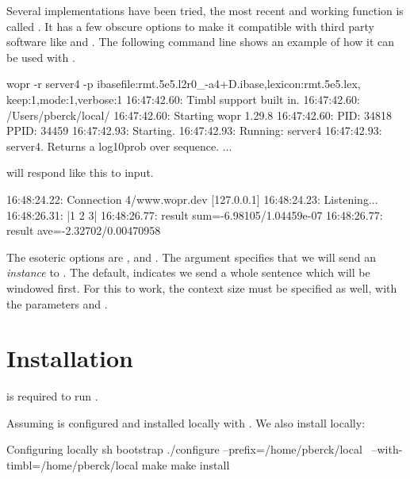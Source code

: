 \documentclass[a4paper,10pt,twoside]{report}
\begin{document}
Several implementations have been tried, the most recent and working
function is called . It has a few obscure options to make
it compatible with third party software like  and
\pbmbmt{}. The following command line shows an example of how it
can be used with \pbmbmt{}.

\begin{bash}{}

wopr -r server4 -p ibasefile:rmt.5e5.l2r0_-a4+D.ibase,lexicon:rmt.5e5.lex,
                   keep:1,mode:1,verbose:1
16:47:42.60: Timbl support built in.
16:47:42.60: /Users/pberck/local/
16:47:42.60: Starting wopr 1.29.8
16:47:42.60: PID:  34818 PPID:  34459
16:47:42.93: Starting.
16:47:42.93: Running: server4
16:47:42.93: server4. Returns a log10prob over sequence.
...
\end{bash}

\Wopr{} will respond like this to input.

\begin{wout}{}
16:48:24.22: Connection 4/www.wopr.dev [127.0.0.1]
16:48:24.23: Listening...
16:48:26.31: |1 2 3|
16:48:26.77: result sum=-6.98105/1.04459e-07
16:48:26.77: result ave=-2.32702/0.00470958
\end{wout}

The esoteric options are , and . The 
argument specifies that we will send an \emph{instance} to
\wopr{}. The default,  indicates we send a whole sentence
which will be windowed first. For this to work, the context size must
be specified as well, with the parameters  and .

\chapter{Installation}

\Timbl{} is required to run \wopr{}.

Assuming \Timbl{} is configured and installed locally with
. We also install \wopr{} locally:

\begin{bash}{Configuring \wopr{} locally}
sh bootstrap
./configure --prefix=/home/pberck/local \
            --with-timbl=/home/pberck/local
make
make install
\end{bash}
\end{document}
